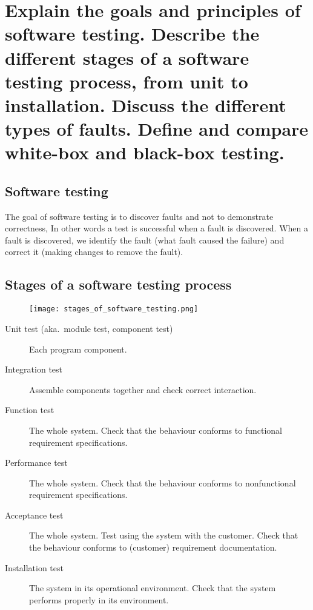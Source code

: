 \clearpage{}
\section{Explain the goals and principles of software testing. Describe the
different stages of a software testing process, from unit to installation.
Discuss the different types of faults. Define and compare white-box and
black-box testing.}


\subsection{Software testing}
The goal of software testing is to discover faults and not to demonstrate correctness,
In other words a test is successful when a fault is discovered. \newline
When a fault is discovered, we identify the fault (what fault caused the failure) and correct it
(making changes to remove the fault).

\subsection{Stages of a software testing process}

\begin{figure}[!ht]
    \centering
    \texttt{[image: stages\_of\_software\_testing.png]}
\end{figure}

\begin{description}
    \item[Unit test (aka.\ module test, component test)]
    Each program component.
    \item[Integration test]
    Assemble components together and check correct interaction.
    \item[Function test]
    The whole system.
    Check that the behaviour conforms to functional requirement specifications.
    \item[Performance test]
    The whole system.
    Check that the behaviour conforms to nonfunctional requirement specifications.
    \item[Acceptance test]
    The whole system.
    Test using the system with the customer.
    Check that the behaviour conforms to (customer) requirement documentation.
    \item[Installation test]
    The system in its operational environment.
    Check that the system performs properly in its environment.
\end{description}


